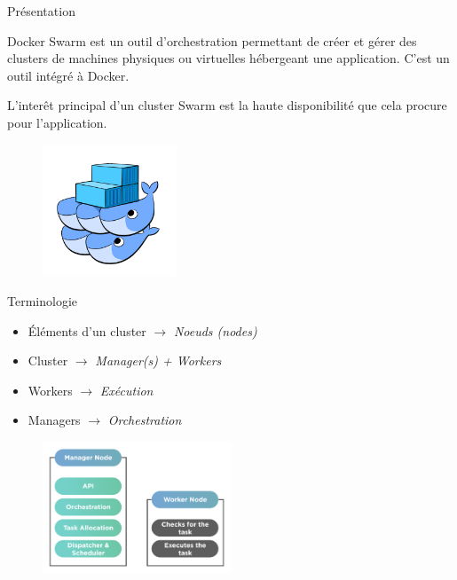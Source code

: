 \documentclass{cubeamer}
\newcommand{\arrow}{$\rightarrow$ }
\begin{document}
\begin{frame}{Présentation}
    \begin{multicols}{2}
    Docker Swarm est un outil d'orchestration permettant de créer et gérer des clusters de
    machines physiques ou virtuelles hébergeant une application. C'est un outil intégré à Docker.

    L'interêt principal d'un cluster Swarm est la haute disponibilité que cela procure pour
    l'application.

    \columnbreak
    \begin{figure}
        \centering
        \includegraphics[width=4cm]{img/swarm}
    \end{figure}

    \end{multicols}
\end{frame}

\begin{frame}{Terminologie}
    \begin{multicols}{2}
        \begin{itemize}
            \item Éléments d'un cluster \arrow \emph{Noeuds (nodes)}
            \item Cluster \arrow \emph{Manager(s) + Workers}
            \item Workers \arrow \emph{Exécution}
            \item Managers \arrow \emph{Orchestration}
        \end{itemize}
    \columnbreak
        \begin{figure}
            \centering
            \includegraphics[width=0.5\textwidth]{img/manager}
        \end{figure}
    \end{multicols}
\end{frame}
\end{document}

